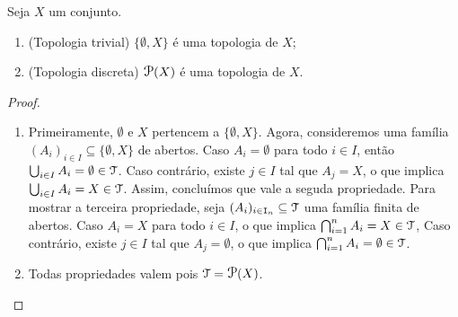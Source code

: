 \begin{prop}
	Seja $X$ um conjunto.
	\begin{enumerate}
	\item (Topologia trivial) $\{\emptyset,X\}$ é uma topologia de $X$;
	\item (Topologia discreta) $\p(X)$ é uma topologia de $X$.
	\end{enumerate}
\end{prop}
\begin{proof}
	\begin{enumerate}
	\item Primeiramente, $\emptyset$ e $X$ pertencem a $\{\emptyset,X\}$. Agora, consideremos uma família $(A_i)_{i \in I} \subseteq \{\emptyset,X\}$ de abertos. Caso $A_i = \emptyset$ para todo $i \in I$, então $\bigcup_{i \in I} A_i = \emptyset \in \mathcal{T}$. Caso contrário, existe $j \in I$ tal que $A_j = X$, o que implica $\bigcup_{i \in I} A_i = X \in \mathcal{T}$. Assim, concluímos que vale a seguda propriedade. Para mostrar a terceira propriedade, seja $(A_i)_{i \in \mathtt I_n} \subseteq \mathcal{T}$ uma família finita de abertos. Caso $A_i=X$ para todo $i \in I$, o que implica $\bigcap_{i=1}^n A_i = X \in \mathcal{T}$, Caso contrário, existe $j \in I$ tal que $A_j = \emptyset$, o que implica $\bigcap_{i=1}^n A_i = \emptyset \in \mathcal{T}$.

	\item Todas propriedades valem pois $\topo = \p(X)$.
\qedhere
	\end{enumerate}
\end{proof}


